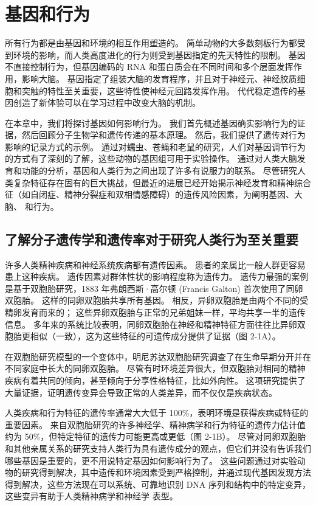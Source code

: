 \chapter{基因和行为}
所有行为都是由基因和环境的相互作用塑造的。 简单动物的大多数刻板行为都受到环境的影响，而人类高度进化的行为则受到基因指定的先天特性的限制。 基因不直接控制行为，但基因编码的 RNA 和蛋白质会在不同时间和多个层面发挥作用，影响大脑。 基因指定了组装大脑的发育程序，并且对于神经元、神经胶质细胞和突触的特性至关重要，这些特性使神经元回路发挥作用。 代代稳定遗传的基因创造了新体验可以在学习过程中改变大脑的机制。

在本章中，我们将探讨基因如何影响行为。 我们首先概述基因确实影响行为的证据，然后回顾分子生物学和遗传传递的基本原理。 然后，我们提供了遗传对行为影响的记录方式的示例。 通过对蠕虫、苍蝇和老鼠的研究，人们对基因调节行为的方式有了深刻的了解，这些动物的基因组可用于实验操作。 通过对人类大脑发育和功能的分析，基因和人类行为之间出现了许多有说服力的联系。 尽管研究人类复杂特征存在固有的巨大挑战，但最近的进展已经开始揭示神经发育和精神综合征（如自闭症、精神分裂症和双相情感障碍）的遗传风险因素，为阐明基因、大脑、 和行为。

\section{了解分子遗传学和遗传率对于研究人类行为至关重要}

许多人类精神疾病和神经系统疾病都有遗传因素。 患者的亲属比一般人群更容易患上这种疾病。 遗传因素对群体性状的影响程度称为遗传力。 遗传力最强的案例是基于双胞胎研究，1883 年弗朗西斯·高尔顿 (Francis Galton) 首次使用了同卵双胞胎。 这样的同卵双胞胎共享所有基因。 相反，异卵双胞胎是由两个不同的受精卵发育而来的； 这些异卵双胞胎与正常的兄弟姐妹一样，平均共享一半的遗传信息。 多年来的系统比较表明，同卵双胞胎在神经和精神特征方面往往比异卵双胞胎更相似（一致），这为这些特征的可遗传成分提供了证据（图 2-1A）。

在双胞胎研究模型的一个变体中，明尼苏达双胞胎研究调查了在生命早期分开并在不同家庭中长大的同卵双胞胎。 尽管有时环境差异很大，但双胞胎对相同的精神疾病有着共同的倾向，甚至倾向于分享性格特征，比如外向性。 这项研究提供了大量证据，证明遗传变异会导致正常的人类差异，而不仅仅是疾病状态。

人类疾病和行为特征的遗传率通常大大低于 100\%，表明环境是获得疾病或特征的重要因素。 来自双胞胎研究的许多神经学、精神病学和行为特征的遗传力估计值约为 50\%，但特定特征的遗传力可能更高或更低（图 2-1B）。 尽管对同卵双胞胎和其他亲属关系的研究支持人类行为具有遗传成分的观点，但它们并没有告诉我们哪些基因是重要的，更不用说特定基因如何影响行为了。 这些问题通过对实验动物的研究得到解决，其中遗传和环境因素受到严格控制，并通过现代基因发现方法得到解决，这些方法现在可以系统、可靠地识别 DNA 序列和结构中的特定变异，这些变异有助于人类精神病学和神经学 表型。

